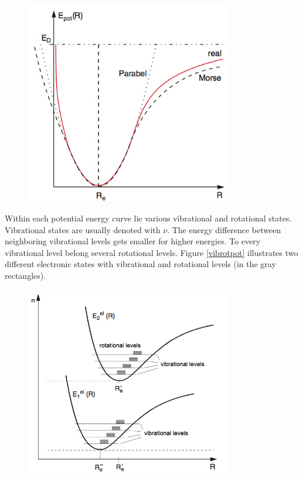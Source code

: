 \documentclass[parskip,12pt,headsepline,a4paper] {scrbook}
\begin{document}
\begin{figure}[ht]
\centerline{
\includegraphics[width=9cm]{./spectroscopy/molecular-potential.jpg}}
\end{figure}

Within each potential energy curve lie various vibrational and rotational states. Vibrational states are usually denoted with $\nu$. The energy difference between neighboring vibrational levels gets smaller for higher energies. To every vibrational level belong several rotational levels. Figure \ref{vibrotpot} illustrates two different electronic states with vibrational and rotational levels (in the gray rectangles).

\begin{figure}[ht]
\centerline{
\includegraphics[width=9cm]{./spectroscopy/vib-rot-pot.jpg}}
\end{figure}
\end{document}
